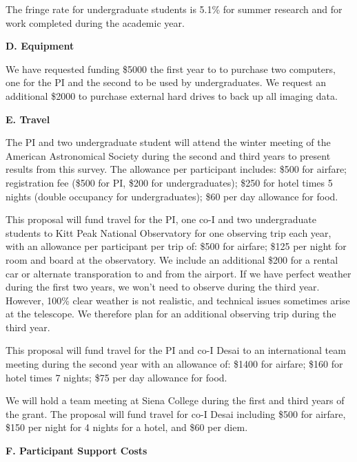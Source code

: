 \documentclass[preprint,11pt]{aastex}
\begin{document}
The fringe rate for undergraduate students is 
5.1\% for summer research and for work completed during the
academic year.

\begin{center}
{\bf \large D. Equipment}
\end{center}

We have requested funding \$5000 the first year to 
to purchase two computers, one for the PI and the second to be used by
undergraduates.  We request an additional \$2000 to purchase external
hard drives to back up all imaging data.

\begin{center}
{\bf \large E. Travel}
\end{center}

The PI and
two undergraduate student will attend 
the winter meeting of the American Astronomical
Society during the second and third years to present results from this survey.  
The allowance per participant 
includes: \$500 for airfare; registration fee (\$500 for PI, 
\$200 for undergraduates); \$250 for hotel times 5 nights
(double occupancy for undergraduates); \$60 per day allowance for food.  

This proposal will fund travel for the PI, one co-I and two undergraduate students 
to Kitt Peak National Observatory for one observing trip each year, with an allowance 
per participant per trip of: \$500 for airfare;
\$125 per night for room and board at the observatory.
We include an additional \$200 for a rental car or 
alternate transporation to and from the airport.
If we have perfect weather during the first two years, we won't need
to observe during the third year.  However, 100\% clear weather is not
realistic, and technical issues sometimes arise at the telescope.  We
therefore plan for an additional observing trip during the third year.


This proposal will fund travel for the PI and co-I Desai to an international team
meeting during the second year with an allowance of:
\$1400 for airfare; \$160 for hotel times 7 nights;
\$75 per day allowance for food.

We will hold a team meeting at Siena College during the first and
third years of the grant.  
The proposal will fund travel for co-I Desai including
\$500 for airfare, \$150 per night for 4 nights for a hotel,
and \$60 per diem.  

\begin{center}
{\bf \large F. Participant Support Costs}
\end{center}
\end{document}
